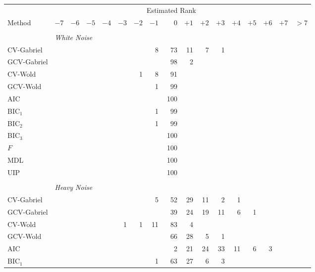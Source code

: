 \begin{table}
    \tiny
    \begin{tabular}{lrrrrrrrrrrrrrrrr}
        \toprule
        &\multicolumn{15}{c}{\scriptsize{Estimated Rank}} \\
        \cmidrule{2-17}
        \scriptsize{Method}
            & $-7$ & $-6$ & $-5$ & $-4$ & $-3$ & $-2$ & $-1$ 
            & $\phantom{+}0$ 
            & $+1$ & $+2$ & $+3$ & $+4$ & $+5$ & $+6$ & $+7$ & $> 7$ \\
        \midrule
        \\
        &\multicolumn{16}{l}{\scriptsize{\textit{White Noise}}} \\
CV-Gabriel &  &  &  &  &  &  &  8 &  73 &  11 &  7 &  1 &  &  &  &  & \\ 
 GCV-Gabriel &  &  &  &  &  &  &  &  98 &  2 &  &  &  &  &  &  & \\ 
 CV-Wold &  &  &  &  &  &  1 &  8 &  91 &  &  &  &  &  &  &  & \\ 
 GCV-Wold &  &  &  &  &  &  &  1 &  99 &  &  &  &  &  &  &  & \\ 
 AIC &  &  &  &  &  &  &  &  100 &  &  &  &  &  &  &  & \\ 
 BIC$_1$ &  &  &  &  &  &  &  1 &  99 &  &  &  &  &  &  &  & \\ 
 BIC$_2$ &  &  &  &  &  &  &  1 &  99 &  &  &  &  &  &  &  & \\ 
 BIC$_3$ &  &  &  &  &  &  &  &  100 &  &  &  &  &  &  &  & \\ 
 $F$ &  &  &  &  &  &  &  &  100 &  &  &  &  &  &  &  & \\ 
 MDL &  &  &  &  &  &  &  &  100 &  &  &  &  &  &  &  & \\ 
 UIP &  &  &  &  &  &  &  &  100 &  &  &  &  &  &  &  & \\ 
        \\
        &\multicolumn{16}{l}{\scriptsize{\textit{Heavy Noise}}} \\
CV-Gabriel &  &  &  &  &  &  &  5 &  52 &  29 &  11 &  2 &  1 &  &  &  & \\ 
 GCV-Gabriel &  &  &  &  &  &  &  &  39 &  24 &  19 &  11 &  6 &  1 &  &  & \\ 
 CV-Wold &  &  &  &  &  1 &  1 &  11 &  83 &  4 &  &  &  &  &  &  & \\ 
 GCV-Wold &  &  &  &  &  &  &  &  66 &  28 &  5 &  1 &  &  &  &  & \\ 
 AIC &  &  &  &  &  &  &  &  2 &  21 &  24 &  33 &  11 &  6 &  3 &  & \\ 
 BIC$_1$ &  &  &  &  &  &  &  1 &  63 &  27 &  6 &  3 &  &  &  &  & \\ 

\end{tabular}
\end{table}
